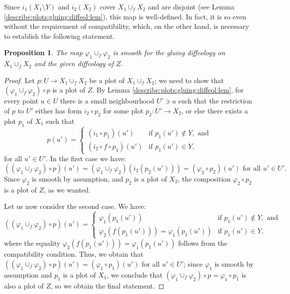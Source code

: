 \documentclass{article}
\newtheorem{prop}[lemma]{Proposition}
\begin{document}
Since $i_1(X_1\setminus Y)$ and $i_2(X_2)$ cover $X_1\cup_f X_2$ and are disjoint (see Lemma \ref{describe:plots:gluing:diffeol:lem}), this map is well-defined. In fact, it is so even without the requirement 
of compatibility, which, on the other hand, is necessary to establish the following statement.

\begin{prop}
The map $\varphi_1\cup_f\varphi_2$ is smooth for the gluing diffeology on $X_1\cup_f X_2$ and the given diffeology of $Z$.
\end{prop}

\begin{proof}
Let $p:U\to X_1\cup_f X_2$ be a plot of $X_1\cup_f X_2$; we need to show that $(\varphi_1\cup_f\varphi_2)\circ p$ is a plot of $Z$. By Lemma \ref{describe:plots:gluing:diffeol:lem}, for every point 
$u\in U$ there is a small neighbourhood $U'\ni u$ such that the restriction of $p$ to $U'$ either has form $i_2\circ p_2$ for some plot $p_2:U'\to X_2$, or else there exists a plot $p_1$ of $X_1$ such that
$$p(u')=\left\{\begin{array}{ll} (i_1\circ p_1)(u') & \mbox{if }p_1(u')\notin Y,\mbox{ and} \\ (i_2\circ f\circ p_1)(u') & \mbox{if }p_1(u')\in Y, \end{array}\right.$$ for all $u'\in U'$. In the first case we have:
$$((\varphi_1\cup_f\varphi_2)\circ p)(u')=(\varphi_1\cup_f\varphi_2)(i_2(p_2(u')))=(\varphi_2\circ p_2)(u')\mbox{ for all }u'\in U'.$$ Since $\varphi_2$ is smooth by assumption, and $p_2$ is a plot of $X_2$,
the composition $\varphi_2\circ p_2$ is a plot of $Z$, as we wanted.

Let us now consider the second case. We have:
$$((\varphi_1\cup_f\varphi_2)\circ p)(u')=\left\{\begin{array}{ll} \varphi_1(p_1(u')) & \mbox{if }p_1(u')\notin Y,\mbox{ and} \\ \varphi_2(f(p_1(u')))=\varphi_1(p_1(u')) & \mbox{if }p_1(u')\in Y, \end{array}\right.$$
where the equality $\varphi_2(f(p_1(u')))=\varphi_1(p_1(u'))$ follows from the compatibility condition. Thus, we obtain that $((\varphi_1\cup_f\varphi_2)\circ p)(u')=(\varphi_1\circ p_1)(u')$ for all $u'\in U'$; 
since $\varphi_1$ is smooth by assumption and $p_1$ is a plot of $X_1$, we conclude that $(\varphi_1\cup_f\varphi_2)\circ p=\varphi_1\circ p_1$ is also a plot of $Z$, so we obtain the final statement.
\end{proof}
\end{document}
